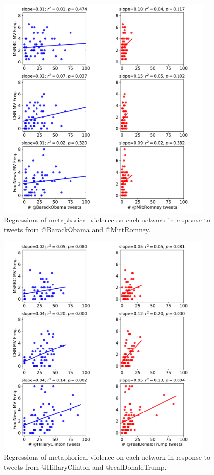 \begin{figure}[!h]
  \centering
    \includegraphics[width=0.95\textwidth]{Figures/2012-network.pdf}
  \caption{Regressions of metaphorical violence on each network in response
   to tweets from @BarackObama and @MittRomney.}
  \label{fig:2012-network}
\end{figure}


\begin{figure}[H]
  \centering
    \includegraphics[width=0.95\textwidth]{Figures/2016-network.pdf}
  \caption{Regressions of metaphorical violence on each network in response
   to tweets from @HillaryClinton and @realDonaldTrump.}
  \label{fig:2016-network}
\end{figure}


